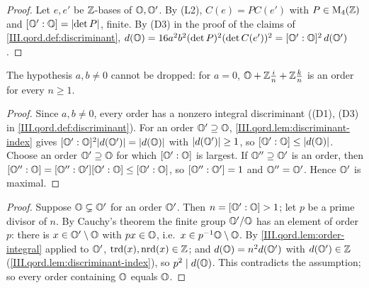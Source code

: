 \begin{lemma}
\end{lemma}
\begin{proof}
Let $e,e'$ be $\mathbb{Z}$-bases of $\mathbb{O},\mathbb{O}'$. By (L2), $C(e)=PC(e')$ with $P\in\mathrm{M}_4(\mathbb{Z})$ and $[\mathbb{O}':\mathbb{O}]=\lvert\det P\rvert$, finite. By (D3) in the proof of the
claims of \cref{III.qord.def:discriminant},
$d(\mathbb{O})=16a^2b^2(\det P)^2(\det C(e'))^2=[\mathbb{O}':\mathbb{O}]^2\,d(\mathbb{O}')$.
\end{proof}

\begin{definition}
\end{definition}

\begin{theorem}
\end{theorem}
\noindent The hypothesis $a,b\ne0$ cannot be dropped: for $a=0$, $\mathbb{O}+\mathbb{Z}\frac in+\mathbb{Z}\frac kn$ is an order for every $n\ge1$.
\begin{proof}
Since $a,b\ne0$, every order has a nonzero integral discriminant ((D1), (D3) in \cref{III.qord.def:discriminant}). For an order $\mathbb{O}'\supseteq\mathbb{O}$,
\cref{III.qord.lem:discriminant-index} gives $[\mathbb{O}':\mathbb{O}]^2\lvert d(\mathbb{O}')\rvert=\lvert d(\mathbb{O})\rvert$ with $\lvert d(\mathbb{O}')\rvert\ge1$, so $[\mathbb{O}':\mathbb{O}]\le\lvert d(\mathbb{O})\rvert$.
Choose an order $\mathbb{O}'\supseteq\mathbb{O}$ for which $[\mathbb{O}':\mathbb{O}]$ is largest. If $\mathbb{O}''\supseteq\mathbb{O}'$ is an order, then
$[\mathbb{O}'':\mathbb{O}]=[\mathbb{O}'':\mathbb{O}'][\mathbb{O}':\mathbb{O}]\le[\mathbb{O}':\mathbb{O}]$, so $[\mathbb{O}'':\mathbb{O}']=1$ and $\mathbb{O}''=\mathbb{O}'$. Hence $\mathbb{O}'$ is maximal.
\end{proof}

\begin{lemma}
\end{lemma}
\begin{proof}
Suppose $\mathbb{O}\subsetneq\mathbb{O}'$ for an order $\mathbb{O}'$. Then $n=[\mathbb{O}':\mathbb{O}]>1$; let $p$ be a prime divisor of $n$. By Cauchy's theorem the finite group
$\mathbb{O}'/\mathbb{O}$ has an element of order $p$: there is $x\in\mathbb{O}'\setminus\mathbb{O}$ with $px\in\mathbb{O}$, i.e.\ $x\in p^{-1}\mathbb{O}\setminus\mathbb{O}$. By
\cref{III.qord.lem:order-integral} applied to $\mathbb{O}'$, $\operatorname{trd}(x),\operatorname{nrd}(x)\in\mathbb{Z}$; and $d(\mathbb{O})=n^2d(\mathbb{O}')$ with $d(\mathbb{O}')\in\mathbb{Z}$
(\cref{III.qord.lem:discriminant-index}), so $p^2\mid d(\mathbb{O})$. This contradicts the assumption; so every order containing $\mathbb{O}$ equals $\mathbb{O}$.
\end{proof}

